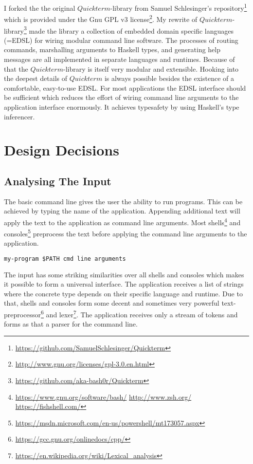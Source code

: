 \documentclass[a4paper]{article}
\begin{document}
I forked the the original $Quickterm$-library from Samuel Schlesinger's repository\footnote{\url{https://github.com/SamuelSchlesinger/Quickterm}} which is provided under the Gnu GPL v3 license\footnote{\url{http://www.gnu.org/licenses/gpl-3.0.en.html}}. My rewrite of $Quickterm$-library\footnote{\url{https://github.com/aka-bash0r/Quickterm}} made the library a collection of embedded domain specific languages (=EDSL) for wiring modular command line software. The processes of routing commands, marshalling arguments to Haskell types, and generating help messages are all implemented in separate languages and runtimes. Because of that the $Quickterm$-library is itself very modular and extensible. Hooking into the deepest details of $Quickterm$ is always possible besides the existence of a comfortable, easy-to-use EDSL. For most applications the EDSL interface should be sufficient which reduces the effort of wiring command line arguments to the application interface enormously. It achieves typesafety by using Haskell's type inferencer.

\section{Design Decisions}
\subsection{Analysing The Input}
The basic command line gives the user the ability to run programs. This can be achieved by typing the name of the application. Appending additional text will apply the text to the application as command line arguments. Most shells\footnote{\url{https://www.gnu.org/software/bash/} \newline\indent\indent\url{http://www.zsh.org/} \newline\indent\indent\url{https://fishshell.com/}} and consoles\footnote{\url{https://msdn.microsoft.com/en-us/powershell/mt173057.aspx}} preprocess the text before applying the command line arguments to the application.

\begin{lstlisting}
my-program $PATH cmd line arguments
\end{lstlisting}

The input has some striking similarities over all shells and consoles which makes it possible to form a universal interface. The application receives a list of strings where the concrete type depends on their specific language and runtime. Due to that, shells and consoles form some decent and sometimes very powerful text-preprocessor\footnote{\url{https://gcc.gnu.org/onlinedocs/cpp/}} and lexer\footnote{\url{https://en.wikipedia.org/wiki/Lexical_analysis}}. The application receives only a stream of tokens and forms as that a parser for the command line.
\end{document}
